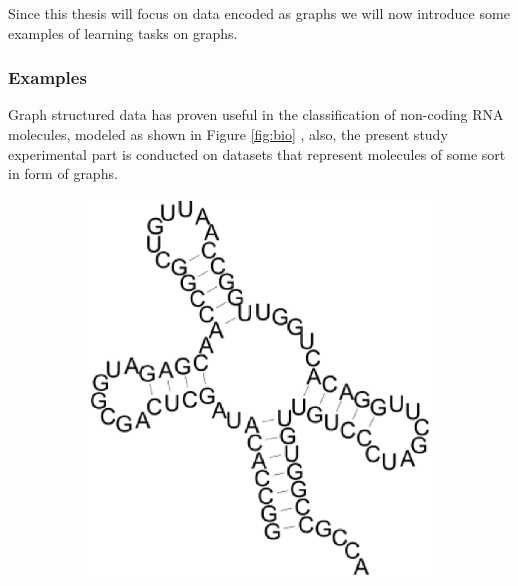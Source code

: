Since this thesis will focus on data encoded as graphs we will now introduce
some examples of learning tasks on graphs.  

\subsubsection{Examples}

Graph structured data has proven useful in the classification of non-coding RNA
molecules, modeled as shown in Figure \ref{fig:bio} \cite{nnavarin, conf/psb/KarklinMH05},
also, the present study experimental part is conducted on datasets that represent
molecules of some sort in form of graphs.

\begin{figure}[ht]
    \centering
    \begin{subfigure}{.4\textwidth}
        \centering
        \includegraphics[width=\linewidth]{Figures/rna}
        \label{fig:rna}
        \caption{}
    \end{subfigure}
    \begin{subfigure}{.4\textwidth}
        \centering

\end{subfigure}
\end{figure}
